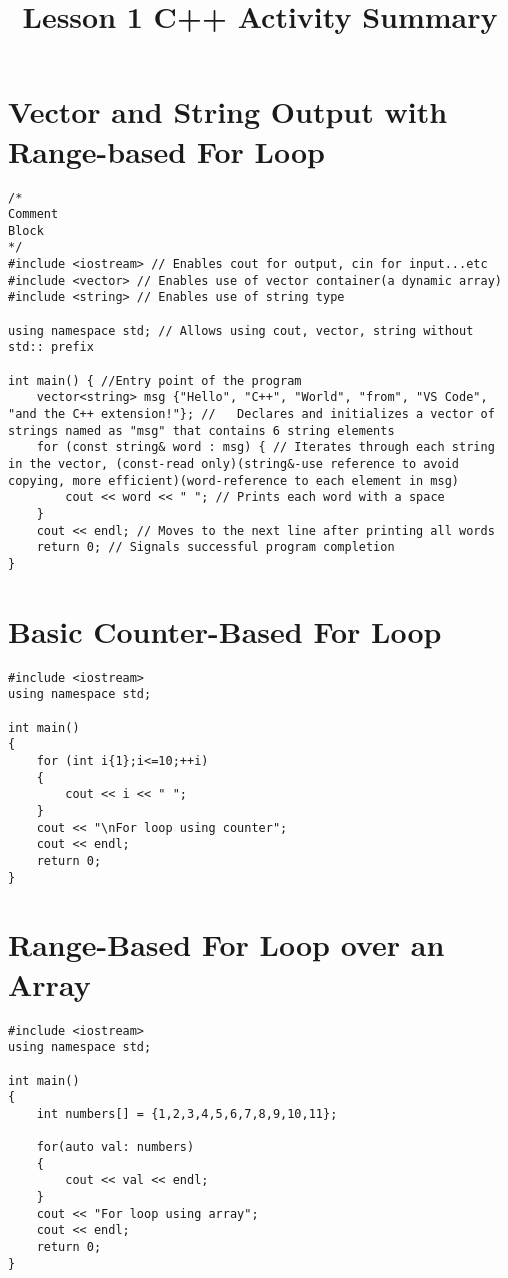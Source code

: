 \documentclass[12pt]{article}
\title{Lesson 1 C++ Activity Summary}
\author{}
\date{}
\begin{document}
\maketitle
\tableofcontents
\newpage

\section*{Vector and String Output with Range-based For Loop}
\begin{verbatim}
/* 
Comment
Block
*/
#include <iostream> // Enables cout for output, cin for input...etc
#include <vector> // Enables use of vector container(a dynamic array)
#include <string> // Enables use of string type

using namespace std; // Allows using cout, vector, string without std:: prefix

int main() { //Entry point of the program
    vector<string> msg {"Hello", "C++", "World", "from", "VS Code", "and the C++ extension!"}; // 	Declares and initializes a vector of strings named as "msg" that contains 6 string elements
    for (const string& word : msg) { // Iterates through each string in the vector, (const-read only)(string&-use reference to avoid copying, more efficient)(word-reference to each element in msg)
        cout << word << " "; // Prints each word with a space
    }
    cout << endl; // Moves to the next line after printing all words
    return 0; // Signals successful program completion
}

\end{verbatim}


\section*{Basic Counter-Based For Loop}
\begin{verbatim}
#include <iostream>
using namespace std;

int main()
{
    for (int i{1};i<=10;++i)
    {
        cout << i << " ";
    }
    cout << "\nFor loop using counter";
    cout << endl;
    return 0;
}
\end{verbatim}


\section*{Range-Based For Loop over an Array}
\begin{verbatim}
#include <iostream>
using namespace std;

int main()
{
    int numbers[] = {1,2,3,4,5,6,7,8,9,10,11};

    for(auto val: numbers)
    {
        cout << val << endl;
    }
    cout << "For loop using array";
    cout << endl;
    return 0;
}  
\end{verbatim}
\end{document}
